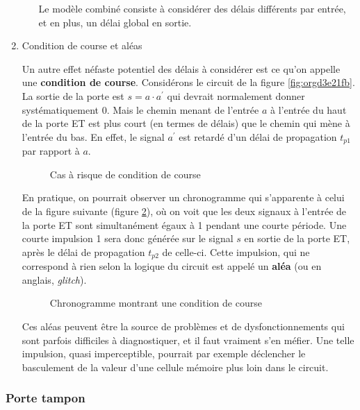 \documentclass[11pt]{article}
\begin{document}
\begin{enumerate}
\begin{enumerate}
Le modèle combiné consiste à considérer des délais différents par
entrée, et en plus, un délai global en sortie.
\end{enumerate}

\item Condition de course et aléas
\label{sec:org16964d9}

Un autre effet néfaste potentiel des délais à considérer est ce qu'on
appelle une \textbf{condition de course}. Considérons le circuit de la figure
\ref{fig:orgd3e21fb}.  La sortie de la porte est \(s = a \cdot a^\prime\) qui
devrait normalement donner systématiquement 0. Mais le chemin menant
de l'entrée \(a\) à l'entrée du haut de la porte ET est plus court (en
termes de délais) que le chemin qui mène à l'entrée du bas. En effet,
le signal \(a^\prime\) est retardé d'un délai de propagation
\(t_{p1}\) par rapport à \(a\).

\begin{figure}[htbp]
\centering

\caption{\label{fig:org1c50aa2}Cas à risque de condition de course}
\end{figure}

En pratique, on pourrait observer un chronogramme qui s'apparente à
celui de la figure suivante (figure \ref{fig:org4b62e43}), où on voit
que les deux signaux à l'entrée de la porte ET sont simultanément
égaux à 1 pendant une courte période. Une courte impulsion 1 sera donc
générée sur le signal \(s\) en sortie de la porte ET, après le délai
de propagation \(t_{p2}\) de celle-ci. Cette impulsion, qui ne
correspond à rien selon la logique du circuit est appelé un \textbf{aléa} (ou
en anglais, \emph{glitch}).

\begin{figure}[htbp]
\centering

\caption{\label{fig:org4b62e43}Chronogramme montrant une condition de course}
\end{figure}

Ces aléas peuvent être la source de problèmes et de dysfonctionnements
qui sont parfois difficiles à diagnostiquer, et il faut vraiment s'en
méfier. Une telle impulsion, quasi imperceptible, pourrait par exemple
déclencher le basculement de la valeur d'une cellule mémoire plus loin
dans le circuit.
\end{enumerate}

\subsubsection{Porte tampon}
\label{sec:org1a37372}
\end{document}
